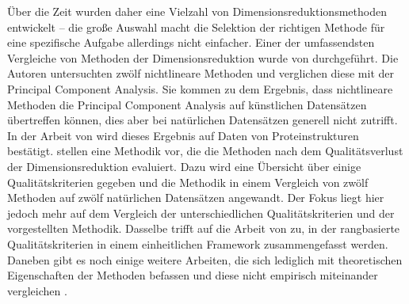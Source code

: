 Über die Zeit wurden daher eine Vielzahl von Dimensionsreduktionsmethoden entwickelt \parencite[siehe z.B.][]{Lee.2007} -- die große Auswahl macht die Selektion der richtigen Methode für
eine spezifische Aufgabe allerdings nicht einfacher. Einer der umfassendsten Vergleiche von
Methoden der Dimensionsreduktion wurde von \Textcite{vanderMaaten.2009} durchgeführt. Die Autoren
untersuchten zwölf nichtlineare Methoden und verglichen diese mit der Principal Component Analysis.
Sie kommen zu dem Ergebnis, dass nichtlineare Methoden die Principal Component Analysis auf
künstlichen Datensätzen übertreffen können, dies aber bei natürlichen Datensätzen generell nicht
zutrifft. In der Arbeit von \textcite{RohanPandit.2016} wird dieses Ergebnis auf Daten von
Proteinstrukturen bestätigt. \Textcite{Gracia.2014} stellen eine Methodik vor, die die Methoden
nach dem Qualitätsverlust der Dimensionsreduktion evaluiert. Dazu wird eine Übersicht über einige
Qualitätskriterien gegeben und die Methodik in einem Vergleich von zwölf Methoden auf zwölf
natürlichen Datensätzen angewandt. Der Fokus liegt hier jedoch mehr auf dem Vergleich der
unterschiedlichen Qualitätskriterien und der vorgestellten Methodik. Dasselbe trifft auf die Arbeit
von \textcite{Lee.2009} zu, in der rangbasierte Qualitätskriterien in einem einheitlichen Framework
zusammengefasst werden. Daneben gibt es noch einige weitere Arbeiten, die sich lediglich mit
theoretischen Eigenschaften der Methoden befassen und diese nicht empirisch miteinander vergleichen \parencites{Cunningham.2014}{Sorzano.2014}{Lee.2007}{Sarveniazi.2014}{Burges.2009b}.

